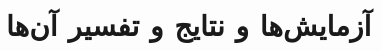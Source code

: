 \newpage

\newcommand{\Mut}{پارامتر تنظیم‌کنندهٔ هم‌بندی}
\newcommand{\Muw}{پارامتر تنظیم‌کنندهٔ وزن}

\chapter{آزمایش‌ها و نتایج و تفسیر آن‌ها}
\label{ch:exper}





\newpage
